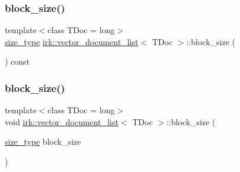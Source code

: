 \mbox{\label{classirk_1_1vector__document__list_ae6a0a3b41d660778ab8dae0e432a47b1}} 
\subsubsection{\texorpdfstring{block\+\_\+size()}{block\_size()}\hspace{0.1cm}{\footnotesize\ttfamily [1/2]}}
{\footnotesize\ttfamily template$<$class T\+Doc  = long$>$ \\
\mbox{\hyperlink{classirk_1_1vector__document__list_ac9387bd9f5dc89b638b6295858a9268c}{size\+\_\+type}} \mbox{\hyperlink{classirk_1_1vector__document__list}{irk\+::vector\+\_\+document\+\_\+list}}$<$ T\+Doc $>$\+::block\+\_\+size (\begin{DoxyParamCaption}{ }\end{DoxyParamCaption}) const\hspace{0.3cm}{\ttfamily [inline]}}

\mbox{\label{classirk_1_1vector__document__list_a1e835fe551a310ba89749812b2e9ea1f}} 
\subsubsection{\texorpdfstring{block\+\_\+size()}{block\_size()}\hspace{0.1cm}{\footnotesize\ttfamily [2/2]}}
{\footnotesize\ttfamily template$<$class T\+Doc  = long$>$ \\
void \mbox{\hyperlink{classirk_1_1vector__document__list}{irk\+::vector\+\_\+document\+\_\+list}}$<$ T\+Doc $>$\+::block\+\_\+size (\begin{DoxyParamCaption}\item[{\mbox{\hyperlink{classirk_1_1vector__document__list_ac9387bd9f5dc89b638b6295858a9268c}{size\+\_\+type}}}]{block\+\_\+size }\end{DoxyParamCaption})\hspace{0.3cm}{\ttfamily [inline]}}

